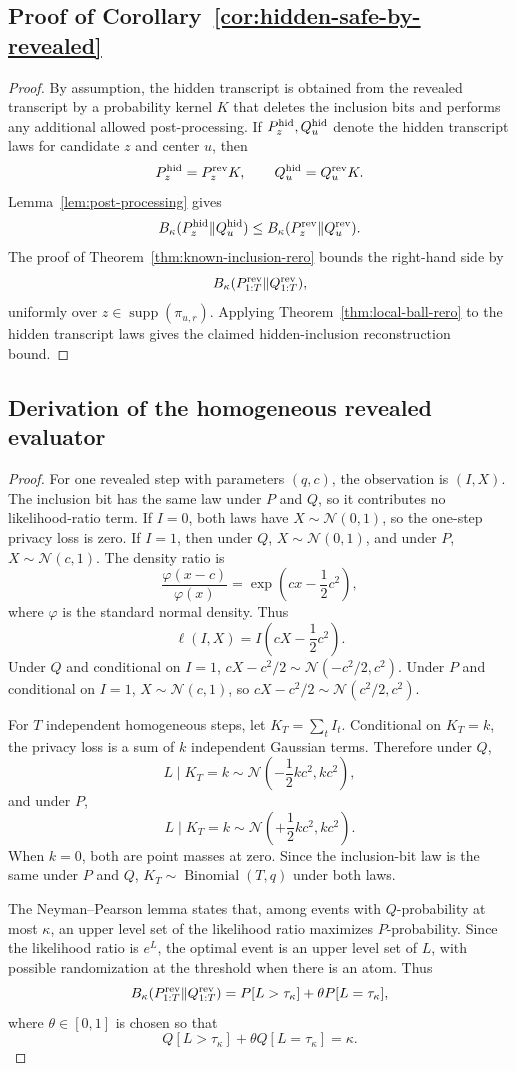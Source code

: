 \documentclass[conference,compsoc]{IEEEtran}
\DeclareMathOperator{\supp}{supp}
\DeclareMathOperator{\Bin}{Binomial}
\newcommand{\N}{\mathcal{N}}
\begin{document}
\subsection{Proof of Corollary~\ref{cor:hidden-safe-by-revealed}}

\begin{proof}
By assumption, the hidden transcript is obtained from the revealed transcript by
a probability kernel $K$ that deletes the inclusion bits and performs any
additional allowed post-processing.  If $P_z^{\rm hid},Q_u^{\rm hid}$ denote the
hidden transcript laws for candidate $z$ and center $u$, then
\[
P_z^{\rm hid}=P_z^{\rm rev}K,
\qquad
Q_u^{\rm hid}=Q_u^{\rm rev}K.
\]
Lemma~\ref{lem:post-processing} gives
\[
B_\kappa(P_z^{\rm hid}\|Q_u^{\rm hid})
\le
B_\kappa(P_z^{\rm rev}\|Q_u^{\rm rev}).
\]
The proof of Theorem~\ref{thm:known-inclusion-rero} bounds the right-hand side
by
\[
B_\kappa(P_{1:T}^{\rm rev}\|Q_{1:T}^{\rm rev}),
\]
uniformly over $z\in\supp(\pi_{u,r})$.  Applying
Theorem~\ref{thm:local-ball-rero} to the hidden transcript laws gives the
claimed hidden-inclusion reconstruction bound.
\end{proof}

\subsection{Derivation of the homogeneous revealed evaluator}

\begin{proof}
For one revealed step with parameters $(q,c)$, the observation is $(I,X)$.  The
inclusion bit has the same law under $P$ and $Q$, so it contributes no
likelihood-ratio term.  If $I=0$, both laws have $X\sim\N(0,1)$, so the
one-step privacy loss is zero.  If $I=1$, then under $Q$, $X\sim\N(0,1)$, and
under $P$, $X\sim\N(c,1)$.  The density ratio is
\[
\frac{\varphi(x-c)}{\varphi(x)}
=
\exp\left(cx-\frac12c^2\right),
\]
where $\varphi$ is the standard normal density.  Thus
\[
\ell(I,X)=I\left(cX-\frac12c^2\right).
\]
Under $Q$ and conditional on $I=1$, $cX-c^2/2\sim\N(-c^2/2,c^2)$.  Under $P$
and conditional on $I=1$, $X\sim\N(c,1)$, so
$cX-c^2/2\sim\N(c^2/2,c^2)$.

For $T$ independent homogeneous steps, let $K_T=\sum_t I_t$.  Conditional on
$K_T=k$, the privacy loss is a sum of $k$ independent Gaussian terms.  Therefore
under $Q$,
\[
L\mid K_T=k\sim\N\left(-\frac12kc^2,kc^2\right),
\]
and under $P$,
\[
L\mid K_T=k\sim\N\left(+\frac12kc^2,kc^2\right).
\]
When $k=0$, both are point masses at zero.  Since the inclusion-bit law is the
same under $P$ and $Q$, $K_T\sim\Bin(T,q)$ under both laws.

The Neyman--Pearson lemma states that, among events with $Q$-probability at
most $\kappa$, an upper level set of the likelihood ratio maximizes
$P$-probability.  Since the likelihood ratio is $e^L$, the optimal event is an
upper level set of $L$, with possible randomization at the threshold when there
is an atom.  Thus
\[
B_\kappa(P_{1:T}^{\rm rev}\|Q_{1:T}^{\rm rev})
=
P[L>\tau_\kappa]+\theta P[L=\tau_\kappa],
\]
where $\theta\in[0,1]$ is chosen so that
\[
Q[L>\tau_\kappa]+\theta Q[L=\tau_\kappa]=\kappa.
\]
\end{proof}
\end{document}
